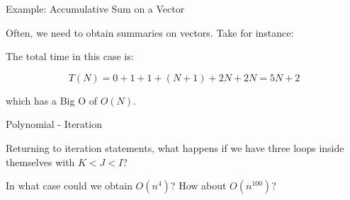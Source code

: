 \begin{frame}[fragile]{Example: Accumulative Sum on a Vector}

Often, we need to obtain summaries on vectors. Take for instance:

\begin{Shaded}
\begin{Highlighting}[]
\StringTok{ }
  \StringTok{ }               
  
  \NormalTok{(}
    \StringTok{ }\StringTok{ }
  \NormalTok{\}}
  
\NormalTok{\}}
\end{Highlighting}
\end{Shaded}

The total time in this case is:

\[T(N) = 0 + 1 + 1 + (N + 1) + 2N + 2N = 5N + 2\]

which has a Big O of \(O(N)\).

\end{frame}

\begin{frame}[fragile]{Polynomial - Iteration}

Returning to iteration statements, what happens if we have three loops
inside themselves with \(K < J < I\)?

\begin{Shaded}
\begin{Highlighting}[]
    \NormalTok{\}}
  \NormalTok{\}}
\NormalTok{\}}
\end{Highlighting}
\end{Shaded}

In what case could we obtain \(O(n^4)\)? How about \(O(n^{100})\)?

\end{frame}

